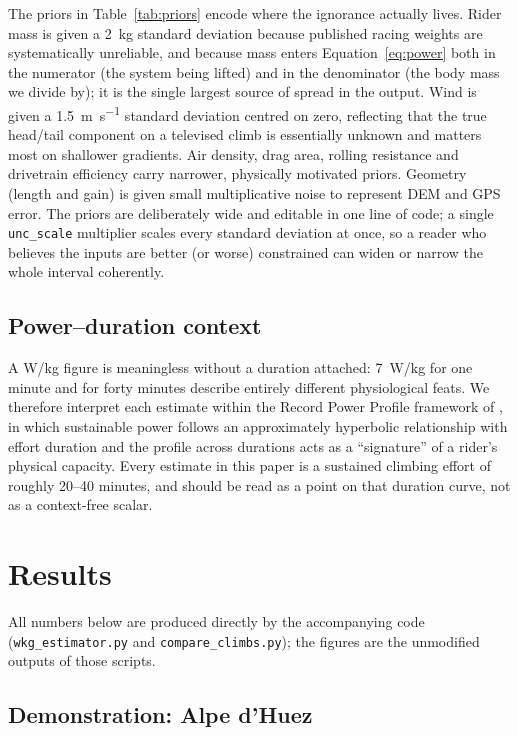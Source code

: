 \documentclass[11pt]{article}
\begin{document}
The priors in Table~\ref{tab:priors} encode where the ignorance actually lives.
Rider mass is given a \SI{2}{\kg} standard deviation because published racing
weights are systematically unreliable, and because mass enters
Equation~\eqref{eq:power} both in the numerator (the system being lifted) and in
the denominator (the body mass we divide by); it is the single largest source of
spread in the output. Wind is given a \SI{1.5}{\meter\per\second} standard
deviation centred on zero, reflecting that the true head/tail component on a
televised climb is essentially unknown and matters most on shallower gradients.
Air density, drag area, rolling resistance and drivetrain efficiency carry
narrower, physically motivated priors. Geometry (length and gain) is given small
multiplicative noise to represent DEM and GPS error. The priors are deliberately
wide and editable in one line of code; a single \texttt{unc\_scale} multiplier
scales every standard deviation at once, so a reader who believes the inputs are
better (or worse) constrained can widen or narrow the whole interval coherently.

\subsection{Power--duration context}
\label{sec:pdcontext}

A W/kg figure is meaningless without a duration attached: \num{7}~W/kg for one
minute and for forty minutes describe entirely different physiological feats. We
therefore interpret each estimate within the Record Power Profile framework of
\citet{pinot2011}, in which sustainable power follows an approximately hyperbolic
relationship with effort duration and the profile across durations acts as a
``signature'' of a rider's physical capacity. Every estimate in this paper is a
sustained climbing effort of roughly \numrange{20}{40} minutes, and should be
read as a point on that duration curve, not as a context-free scalar.

\section{Results}

All numbers below are produced directly by the accompanying code
(\texttt{wkg\_estimator.py} and \texttt{compare\_climbs.py}); the figures are the
unmodified outputs of those scripts.

\subsection{Demonstration: Alpe d'Huez}
\end{document}
